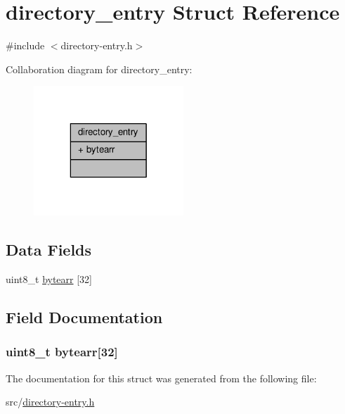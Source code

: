 \hypertarget{structdirectory__entry}{\section{directory\-\_\-entry Struct Reference}
\label{structdirectory__entry}
}


{\ttfamily \#include $<$directory-\/entry.\-h$>$}



Collaboration diagram for directory\-\_\-entry\-:\nopagebreak
\begin{figure}[H]
\begin{center}
\leavevmode
\includegraphics[width=160pt]{structdirectory__entry__coll__graph}
\end{center}
\end{figure}
\subsection*{Data Fields}
\begin{DoxyCompactItemize}
\item 
uint8\-\_\-t \hyperlink{structdirectory__entry_a380aef5511e7e06c9677a3ef970b32bc}{bytearr} \mbox{[}32\mbox{]}
\end{DoxyCompactItemize}


\subsection{Field Documentation}
\hypertarget{structdirectory__entry_a380aef5511e7e06c9677a3ef970b32bc}{
\subsubsection[{bytearr}]{\setlength{\rightskip}{0pt plus 5cm}uint8\-\_\-t bytearr\mbox{[}32\mbox{]}}}\label{structdirectory__entry_a380aef5511e7e06c9677a3ef970b32bc}


The documentation for this struct was generated from the following file\-:\begin{DoxyCompactItemize}
\item 
src/\hyperlink{directory-entry_8h}{directory-\/entry.\-h}\end{DoxyCompactItemize}

